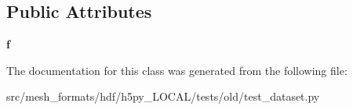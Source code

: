 \subsection*{Public Attributes}
\begin{DoxyCompactItemize}
\item 
\mbox{\label{classh5py__LOCAL_1_1tests_1_1old_1_1test__dataset_1_1TestVlen_af2c61e33bb91e5ec078eb079bcb73ad6}} 
{\bfseries f}
\end{DoxyCompactItemize}


The documentation for this class was generated from the following file\+:\begin{DoxyCompactItemize}
\item 
src/mesh\+\_\+formats/hdf/h5py\+\_\+\+L\+O\+C\+A\+L/tests/old/test\+\_\+dataset.\+py\end{DoxyCompactItemize}
